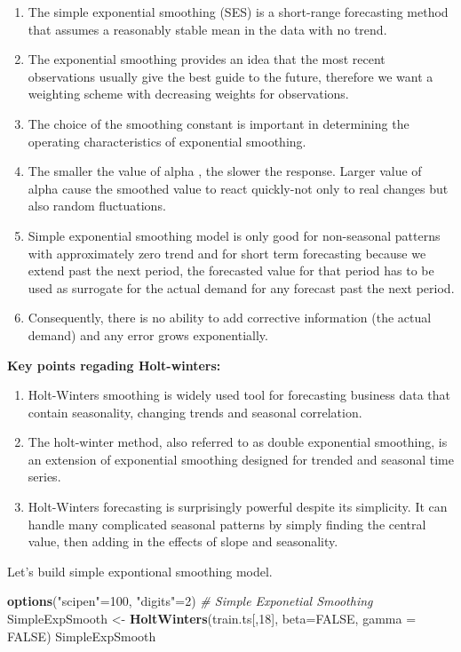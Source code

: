 \documentclass[12pt,openany]{book}
\newenvironment{Shaded}{\begin{snugshade}}{\end{snugshade}}
\newcommand{\CommentTok}[1]{\textcolor[rgb]{0.56,0.35,0.01}{\textit{#1}}}
\newcommand{\DataTypeTok}[1]{\textcolor[rgb]{0.13,0.29,0.53}{#1}}
\newcommand{\DecValTok}[1]{\textcolor[rgb]{0.00,0.00,0.81}{#1}}
\newcommand{\KeywordTok}[1]{\textcolor[rgb]{0.13,0.29,0.53}{\textbf{#1}}}
\newcommand{\NormalTok}[1]{#1}
\newcommand{\OtherTok}[1]{\textcolor[rgb]{0.56,0.35,0.01}{#1}}
\newcommand{\StringTok}[1]{\textcolor[rgb]{0.31,0.60,0.02}{#1}}
\providecommand{\tightlist}{%
  \setlength{\itemsep}{0pt}\setlength{\parskip}{0pt}}
\begin{document}
\begin{enumerate}
\def\labelenumi{\arabic{enumi}.}
\tightlist
\item
  The simple exponential smoothing (SES) is a short-range forecasting method that assumes a reasonably stable mean in the data with no trend.
\item
  The exponential smoothing provides an idea that the most recent observations usually give the best guide to the future, therefore we want a weighting scheme with decreasing weights for observations.
\item
  The choice of the smoothing constant is important in determining the operating characteristics of exponential smoothing.
\item
  The smaller the value of alpha , the slower the response. Larger value of alpha cause the smoothed value to react quickly-not only to real changes but also random fluctuations.
\item
  Simple exponential smoothing model is only good for non-seasonal patterns with approximately zero trend and for short term forecasting because we extend past the next period, the forecasted value for that period has to be used as surrogate for the actual demand for any forecast past the next period.
\item
  Consequently, there is no ability to add corrective information (the actual demand) and any error grows exponentially.
\end{enumerate}

\textbf{Key points regading Holt-winters:}

\begin{enumerate}
\def\labelenumi{\arabic{enumi}.}
\tightlist
\item
  Holt-Winters smoothing is widely used tool for forecasting business data that contain seasonality, changing trends and seasonal correlation.
\item
  The holt-winter method, also referred to as double exponential smoothing, is an extension of exponential smoothing designed for trended and seasonal time series.
\item
  Holt-Winters forecasting is surprisingly powerful despite its simplicity. It can handle many complicated seasonal patterns by simply finding the central value, then adding in the effects of slope and seasonality.
\end{enumerate}

Let's build simple expontional smoothing model.

\begin{Shaded}
\begin{Highlighting}[]
\KeywordTok{options}\NormalTok{(}\StringTok{"scipen"}\NormalTok{=}\DecValTok{100}\NormalTok{, }\StringTok{"digits"}\NormalTok{=}\DecValTok{2}\NormalTok{)}
\CommentTok{# Simple Exponetial Smoothing}
\NormalTok{SimpleExpSmooth <-}\StringTok{ }\KeywordTok{HoltWinters}\NormalTok{(train.ts[,}\DecValTok{18}\NormalTok{], }\DataTypeTok{beta=}\OtherTok{FALSE}\NormalTok{, }\DataTypeTok{gamma =} \OtherTok{FALSE}\NormalTok{)}
\NormalTok{SimpleExpSmooth}
\end{Highlighting}
\end{Shaded}
\end{document}
